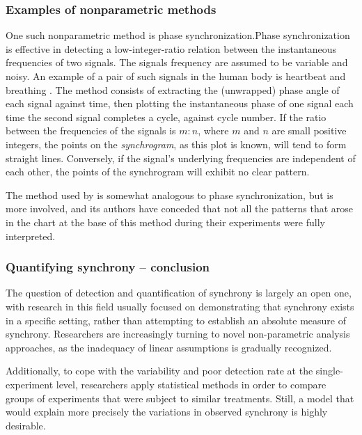 \documentclass[a4paper, 11pt]{article}      %
\begin{document}
\subsubsection{Examples of nonparametric methods}
One such nonparametric method is phase synchronization.Phase synchronization is effective in detecting a low-integer-ratio relation between the instantaneous frequencies of two signals. The signals frequency are assumed to be variable and noisy. An example of a pair of such signals in the human body is heartbeat and breathing \citep{schafer1998heartbeat}. The method consists of extracting the (unwrapped) phase angle of each signal against time, then plotting the instantaneous phase of one signal each time the second signal completes a cycle, against cycle number. If the ratio between the frequencies of the signals is $m:n$, where $m$ and $n$ are small positive integers, the points on the \emph{synchrogram}, as this plot is known, will tend to form straight lines. Conversely, if the signal's underlying frequencies are independent of each other, the points of the synchrogram will exhibit no clear pattern.

The method used by \cite{wallot2016multidimensional} is somewhat analogous to phase synchronization, but is more involved, and its authors have conceded that not all the patterns that arose in the chart at the base of this method during their experiments were fully interpreted.

\subsubsection{Quantifying synchrony -- conclusion}
The question of detection and quantification of synchrony is largely an open one, with research in this field usually focused on demonstrating that synchrony exists in a specific setting, rather than attempting to establish an absolute measure of synchrony. Researchers are increasingly turning to novel non-parametric analysis approaches, as the inadequacy of linear assumptions is gradually recognized. 

Additionally, to cope with the variability and poor detection rate at the single-experiment level, researchers apply statistical methods in order to compare groups of experiments that were subject to similar treatments. Still, a model that would explain more precisely the variations in observed synchrony is highly desirable.   
\end{document}
